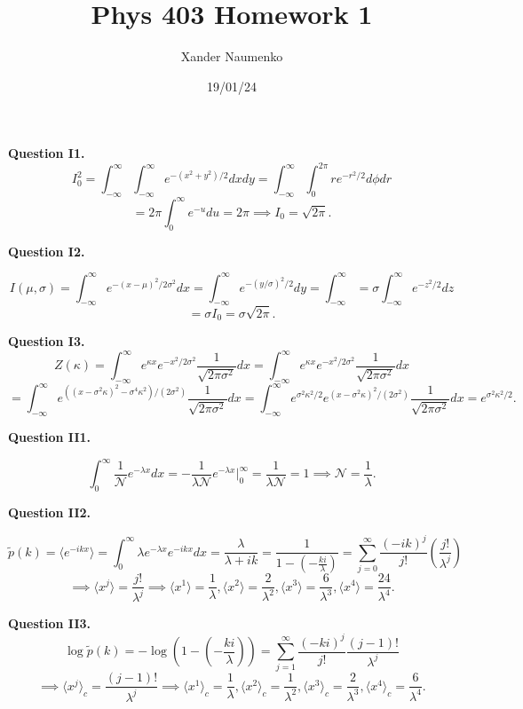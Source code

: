 \documentclass[letterpaper, reqno,11pt]{article}
\begin{document}
\title{Phys 403 Homework 1}
\date{19/01/24}
\author{Xander Naumenko}
\maketitle

{\medskip\noindent\bf Question I1.}
\[
I_0^2=\int_{-\infty}^{\infty}\int_{-\infty}^{\infty}e^{-(x^2+y^2) /2}dxdy=\int_{-\infty}^{\infty}\int_{0}^{2\pi}re^{-r^2 /2}d\phi dr
\]
\[
=2\pi\int_{0}^{\infty}e^{-u}du=2\pi \implies I_0=\sqrt{2\pi}
.\]

{\medskip\noindent\bf Question I2.} 

\[
    I(\mu, \sigma)=\int_{-\infty}^{\infty}e^{-(x-\mu)^2 /2\sigma^2}dx=\int_{-\infty}^{\infty}e^{-(y /\sigma)^2 /2}dy = \int_{-\infty}^{\infty}=\sigma\int_{-\infty}^{\infty}e^{-z^2 /2}dz
\]
\[
=\sigma I_0=\sigma \sqrt{2\pi}
.\]

{\medskip\noindent\bf Question I3.}
\[
Z(\kappa)=\int_{-\infty}^{\infty} e^{\kappa x}e^{-x^2 /2\sigma ^2} \frac{1}{\sqrt{2\pi\sigma^2}}dx=\int_{-\infty}^{\infty} e^{\kappa x}e^{-x^2 /2\sigma ^2} \frac{1}{\sqrt{2\pi\sigma^2}}dx
\]
\[
=\int_{-\infty}^{\infty}e^{\left(\left( x-\sigma^2\kappa \right)^2-\sigma^{4}\kappa^2\right) /(2\sigma ^2) } \frac{1}{\sqrt{2\pi\sigma^2}}dx=\int_{-\infty}^{\infty}e^{\sigma^2\kappa^2/2}e^{\left( x-\sigma^2\kappa \right)^2 /(2\sigma ^2) } \frac{1}{\sqrt{2\pi\sigma^2}}dx=e^{\sigma^2\kappa^2 /2}
.\]

{\medskip\noindent\bf Question II1.} 

\[
    \int_{0}^{\infty}\frac{1}{\mathcal N}e^{-\lambda x}dx=-\frac{1}{\lambda\mathcal N} e^{-\lambda x}\bigg|_0^{\infty}=\frac{1}{\lambda\mathcal N}=1\implies \mathcal N = \frac{1}{\lambda}
.\]

{\medskip\noindent\bf Question II2.} 

\[
\tilde p(k) = \langle e^{-ikx} \rangle =\int_{0}^{\infty}\lambda e^{-\lambda x}e^{-ikx}dx=\frac{\lambda}{\lambda+ik}= \frac{1}{1-(-\frac{ki}{\lambda})} =\sum_{j=0}^{\infty}\frac{(-ik)^{j}}{j!}\left( \frac{j!}{\lambda^{j}} \right) 
\]
\[
\implies \langle x^{j} \rangle =\frac{j!}{\lambda^{j}} \implies \langle x^{1} \rangle =\frac{1}{\lambda}, \langle x^{2} \rangle =\frac{2}{\lambda^2}, \langle x^{3} \rangle =\frac{6}{\lambda^3}, \langle x^{4} \rangle =\frac{24}{\lambda^{4}}
.\]

{\medskip\noindent\bf Question II3.} 
\[
\log\tilde p(k)=-\log \left( 1-\left(- \frac{ki}{\lambda}\right) \right)=\sum_{j=1}^{\infty}\frac{(-ki)^{j}}{j!}\frac{(j-1)!}{\lambda^{j}}
\]
\[
\implies \langle x^{j} \rangle _c= \frac{(j-1)!}{\lambda^{j}}\implies \langle x^{1} \rangle_c =\frac{1}{\lambda}, \langle x^{2} \rangle_c =\frac{1}{\lambda^2}, \langle x^{3} \rangle_c =\frac{2}{\lambda^3}, \langle x^{4} \rangle_c =\frac{6}{\lambda^{4}}
.\]
\end{document}
